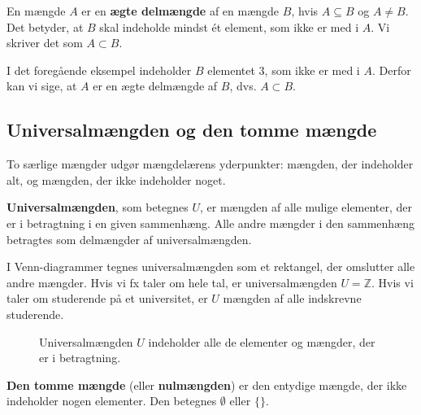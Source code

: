 \begin{definition}
    En mængde $A$ er en \textbf{ægte delmængde} af en mængde $B$, hvis $A \subseteq B$ og $A \neq B$. Det betyder, at $B$ skal indeholde mindst ét element, som ikke er med i $A$. Vi skriver det som $A \subset B$.
\end{definition}

I det foregående eksempel indeholder $B$ elementet $3$, som ikke er med i $A$. Derfor kan vi sige, at $A$ er en ægte delmængde af $B$, dvs. $A \subset B$.

\subsection*{Universalmængden og den tomme mængde}
To særlige mængder udgør mængdelærens yderpunkter: mængden, der indeholder alt, og mængden, der ikke indeholder noget.

\begin{definition}[Universalmængde]
    \textbf{Universalmængden}, som betegnes $U$, er mængden af alle mulige elementer, der er i betragtning i en given sammenhæng. Alle andre mængder i den sammenhæng betragtes som delmængder af universalmængden.
\end{definition}

I Venn-diagrammer tegnes universalmængden som et rektangel, der omslutter alle andre mængder. Hvis vi fx taler om hele tal, er universalmængden $U = \mathbb{Z}$. Hvis vi taler om studerende på et universitet, er $U$ mængden af alle indskrevne studerende.

\begin{figure}[htbp]
    \centering
    \caption{Universalmængden $U$ indeholder alle de elementer og mængder, der er i betragtning.}
    \label{fig:universal_set}
\end{figure}

\begin{definition}
    \textbf{Den tomme mængde} (eller \textbf{nulmængden}) er den entydige mængde, der ikke indeholder nogen elementer. Den betegnes $\emptyset$ eller $\{\}$.
\end{definition}

